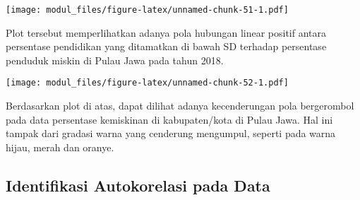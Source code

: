 \documentclass[
]{book}
\newenvironment{Shaded}{\begin{snugshade}}{\end{snugshade}}
\newcommand{\DataTypeTok}[1]{\textcolor[rgb]{0.13,0.29,0.53}{#1}}
\newcommand{\DecValTok}[1]{\textcolor[rgb]{0.00,0.00,0.81}{#1}}
\newcommand{\KeywordTok}[1]{\textcolor[rgb]{0.13,0.29,0.53}{\textbf{#1}}}
\newcommand{\NormalTok}[1]{#1}
\newcommand{\OperatorTok}[1]{\textcolor[rgb]{0.81,0.36,0.00}{\textbf{#1}}}
\newcommand{\StringTok}[1]{\textcolor[rgb]{0.31,0.60,0.02}{#1}}
\begin{document}
\begin{Shaded}
\end{Shaded}

\texttt{[image: modul\_files/figure-latex/unnamed-chunk-51-1.pdf]}

Plot tersebut memperlihatkan adanya pola hubungan linear positif antara persentase pendidikan yang ditamatkan di bawah SD terhadap persentase penduduk miskin di Pulau Jawa pada tahun 2018.

\begin{Shaded}
\end{Shaded}

\texttt{[image: modul\_files/figure-latex/unnamed-chunk-52-1.pdf]}

Berdasarkan plot di atas, dapat dilihat adanya kecenderungan pola bergerombol pada data persentase kemiskinan di kabupaten/kota di Pulau Jawa. Hal ini tampak dari gradasi warna yang cenderung mengumpul, seperti pada warna hijau, merah dan oranye.

\hypertarget{identifikasi-autokorelasi-pada-data}{%
\subsection{Identifikasi Autokorelasi pada Data}\label{identifikasi-autokorelasi-pada-data}}
\end{document}
